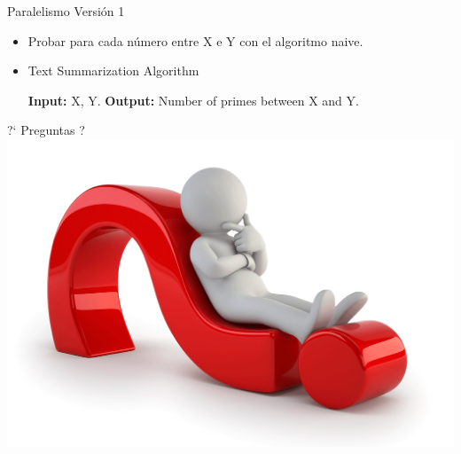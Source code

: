 \documentclass[compress]{beamer}
\begin{document}
\begin{frame}[fragile]{Paralelismo Versión 1}
  \begin{itemize}
    \setlength\itemsep{1em}
    \item<1-> Probar para cada número entre X e Y con el algoritmo naive.
    \item<2->
     \begin{algorithm}[H]
        \caption{Text Summarization Algorithm}\label{euclid}
        \begin{algorithmic}[1]
            \newline
            \textbf{Input:} X, Y.\newline
            \textbf{Output:} Number of primes between X and Y.
            \EndProcedure
        \end{algorithmic}
        \label{alg_1}
      \end{algorithm}

  \end{itemize}
\end{frame}


\begin{frame}
  \begin{center}

  {\Huge ?` Preguntas ?}
  \\
  \includegraphics[scale=0.235]{imagenes/preguntas.png}

  \end{center}
\end{frame}
\end{document}
